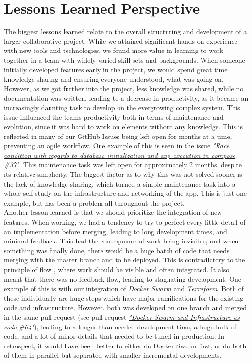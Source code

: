 \documentclass[11pt]{article}
\begin{document}
\section{Lessons Learned Perspective}
The biggest lessons learned relate to the overall structuring and development of a larger collaborative project. While we attained significant hands-on experience with new tools and technologies, we found more value in learning to work together in a team with widely varied skill sets and backgrounds. When someone initially developed features early in the project, we would spend great time knowledge sharing and ensuring everyone understood, what was going on. However, as we got further into the project, less knowledge was shared, while no documentation was written, leading to a decrease in productivity, as it became an increasingly daunting task to develop on the evergrowing complex system. This issue influenced the teams productivity both in terms of maintenance and evolution, since it was hard to work on elements without any knowledge. This is reflected in many of our GitHub Issues being left open for months at a time, preventing an agile workflow. One example of this is seen in the issue \href{https://github.com/group-o-minitwit-2024/MiniTwit/issues/37}{\textit{"Race condition with regards to database initialization and app execution in compose \#37"}}. This maintenance task was left open for approximately 2 months, despite its relative simplicity. The biggest factor as to why this was not solved sooner is the lack of knowledge sharing, which turned a simple maintenance task into a whole self study on the infrastructure and networking of the app. This is just one example, but has been a problem all throughout the project. \\

Another lesson learned is that we should prioritize the integration of new features. When working, we had a tendency to try to perfect every little detail of an implementation before merging, leading to long development times, and minimal feedback. This had the consequence of work being invisible, and when something was finally done, there would be a huge batch of code that needs merging with the master branch and to be deployed. This is contradictory to the principle of flow \citep{devops_handbook}, where work should be visible and often integrated. It also meant that there was no feedback flow, leading to stagnating development. One example of this is with our integration of \textit{Docker Swarm} and \textit{Terraform}. Both of these individually are huge steps which have major ramifications for the existing code and infrastructure. However, both was developed on one branch and merged in the same pull request (see pull request \href{https://github.com/group-o-minitwit-2024/MiniTwit/pull/64}{\textit{"Docker Swarm and Infrastructure as code \#64"}}), leading to a longer than needed development time, a huge bulk of code, and a lot of minor details that needed to be tuned in production. In retrospect, it would have been better to either do Docker Swarm first, or do both of them in parallel but separated with smaller incremental developments. 
\end{document}
